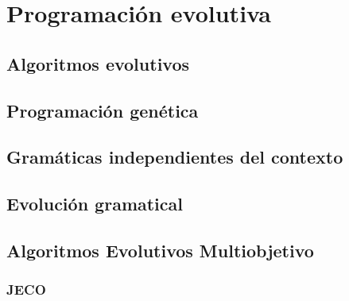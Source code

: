\chapter{Programación evolutiva}

\section{Algoritmos evolutivos}

\section{Programación genética}

\section{Gramáticas independientes del contexto}

\section{Evolución gramatical}

\section{Algoritmos Evolutivos Multiobjetivo}

\subsection{JECO}
